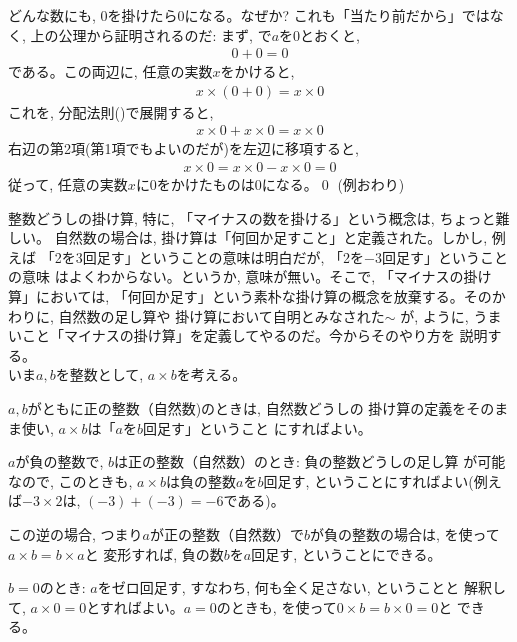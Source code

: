 \begin{exmpl} どんな数にも, 0を掛けたら0になる。なぜか? 
これも「当たり前だから」ではなく, 上の公理から証明されるのだ: 
まず, で$a$を0とおくと, 
\begin{eqnarray}
0+0=0
\end{eqnarray}
である。この両辺に, 任意の実数$x$をかけると, 
\begin{eqnarray}
x\times(0+0)=x\times0
\end{eqnarray}
これを, 分配法則()で展開すると, 
\begin{eqnarray}
x\times0+x\times0=x\times0
\end{eqnarray}
右辺の第2項(第1項でもよいのだが)を左辺に移項すると, 
\begin{eqnarray}
x\times0=x\times0-x\times0=0
\end{eqnarray}
従って, 任意の実数$x$に0をかけたものは0になる。\qed
(例おわり)\end{exmpl}


整数どうしの掛け算, 特に, 「マイナスの数を掛ける」という概念は, ちょっと難しい。
自然数の場合は, 掛け算は「何回か足すこと」と定義された。しかし, 例えば
「2を3回足す」ということの意味は明白だが, 「2を$-3$回足す」ということの意味
はよくわからない。というか, 意味が無い。そこで, 「マイナスの掛け算」においては, 
「何回か足す」という素朴な掛け算の概念を放棄する。そのかわりに, 自然数の足し算や
掛け算において自明とみなされた$\sim$
が, ように, 
うまいこと「マイナスの掛け算」を定義してやるのだ。今からそのやり方を
説明する。\\

いま$a, b$を整数として, $a\times b$を考える。

$a, b$がともに正の整数（自然数)のときは, 自然数どうしの
掛け算の定義をそのまま使い, $a\times b$は「$a$を$b$回足す」ということ
にすればよい。

$a$が負の整数で, $b$は正の整数（自然数）のとき: 負の整数どうしの足し算
が可能なので, このときも, $a\times b$は負の整数$a$を$b$回足す, 
ということにすればよい(例えば$-3\times2$は, $(-3)+(-3)=-6$である)。

この逆の場合, つまり$a$が正の整数（自然数）で$b$が負の整数の場合は, 
を使って$a\times b=b\times a$と
変形すれば, 負の数$b$を$a$回足す, ということにできる。

$b=0$のとき: $a$をゼロ回足す, すなわち, 何も全く足さない, ということと
解釈して, $a\times 0=0$とすればよい。$a=0$のときも, 
を使って$0\times b=b\times 0=0$と
できる。



